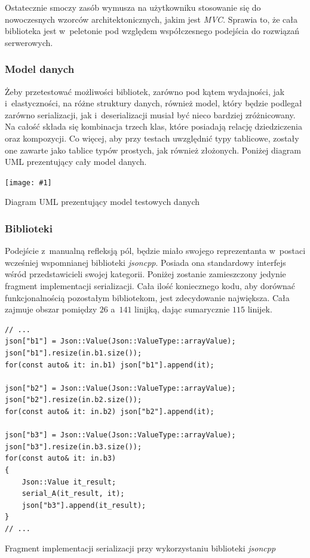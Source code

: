 \documentclass[12pt]{article}
\newcommand{\n}{\newline}
\newcommand{\putfig}[3]{
\begin{captioned}[H]
	\centering
	\texttt{[image: \#1]}
	\caption{#2}
	\label{#3}
	\medskip
\end{captioned}
}
\newcommand{\nonpl}[1]{{\it #1}}
\begin{document}
{{{				Ostatecznie smoczy zasób wymusza na użytkowniku stosowanie się do nowoczesnych wzorców architektonicznych, jakim jest \nonpl{MVC}\cite{mvc}.
				Sprawia to, że cała biblioteka jest w~peletonie pod względem współczesnego podejścia do rozwiązań serwerowych.
			}

			{
				\subsubsection{Model danych}

				Żeby przetestować możliwości bibliotek, zarówno pod kątem wydajności, jak i~elastyczności, na różne struktury danych,
				również model, który będzie podlegał zarówno serializacji, jak i~deserializacji musiał być nieco bardziej zróżnicowany.
				Na całość składa się kombinacja trzech klas, które posiadają relację dziedziczenia oraz kompozycji. Co więcej, aby przy
				testach uwzględnić typy tablicowe, zostały one zawarte jako tablice typów prostych, jak również złożonych. Poniżej
				diagram UML prezentujący cały model danych.

				\putfig{./img/benchmark_model_uml_diagram.png}{Diagram UML prezentujący model testowych danych}{uml_diagram}
			}

			{
				\subsubsection{Biblioteki}

				Podejście z~manualną refleksją pól, będzie miało swojego reprezentanta w~postaci wcześniej wspomnianej biblioteki \nonpl{jsoncpp}.
				Posiada ona standardowy interfejs wśród przedstawicieli swojej kategorii. Poniżej zostanie zamieszczony jedynie fragment
				implementacji serializacji. Cała ilość koniecznego kodu, aby dorównać funkcjonalnością pozostałym bibliotekom, jest zdecydowanie
				największa. Cała zajmuje obszar pomiędzy $26$ a~$141$ linijką, dając sumarycznie $115$ linijek.\n

				\begin{captioned}[H]
					\begin{lstlisting}[frame=single]
// ...
json["b1"] = Json::Value(Json::ValueType::arrayValue);
json["b1"].resize(in.b1.size());
for(const auto& it: in.b1) json["b1"].append(it);

json["b2"] = Json::Value(Json::ValueType::arrayValue);
json["b2"].resize(in.b2.size());
for(const auto& it: in.b2) json["b2"].append(it);

json["b3"] = Json::Value(Json::ValueType::arrayValue);
json["b3"].resize(in.b3.size());
for(const auto& it: in.b3)
{
	Json::Value it_result;
	serial_A(it_result, it);
	json["b3"].append(it_result);
}
// ...
					\end{lstlisting}
					\caption{ Fragment implementacji serializacji przy wykorzystaniu biblioteki \nonpl{jsoncpp}}
					\label{jsoncpp_impl}
				\end{captioned}

}}}
\end{document}
